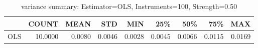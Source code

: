\begin{table}[ht]
\centering
\caption{variance summary: Estimator=OLS, Instruments=100, Strength=0.50}
\begin{tabular}{lrrrrrrrr}
\toprule
 & COUNT & MEAN & STD & MIN & 25\% & 50\% & 75\% & MAX \\
\midrule
OLS & 10.0000 & 0.0080 & 0.0046 & 0.0028 & 0.0045 & 0.0066 & 0.0115 & 0.0169 \\
\bottomrule
\end{tabular}
\end{table}
